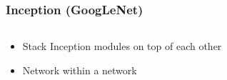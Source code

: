 \documentclass{beamer}
\begin{document}
\begin{frame}
    \frametitle{Inception (GoogLeNet)}
	\begin{columns}
		
\begin{column}{0.5\textwidth}

    \begin{itemize}
        \item Stack Inception modules on top of each other
        \item Network within a network
    \end{itemize}

    \begin{figure}
    \end{figure}
		

\end{column}
\end{columns}
\end{frame}
\end{document}
